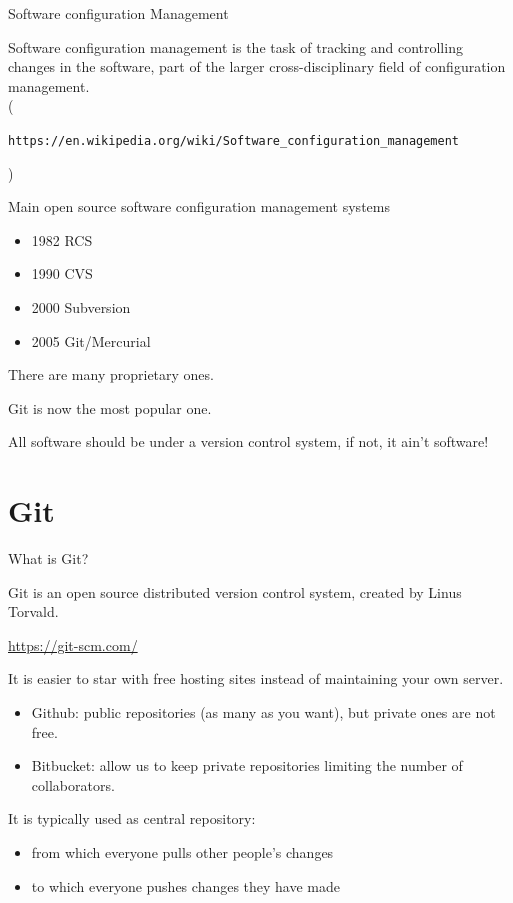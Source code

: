 \documentclass{beamer}
\begin{document}
\begin{frame}[plain]{Software configuration Management}


Software configuration management is the task of tracking and controlling changes in the software, part of the larger cross-disciplinary field of configuration management.\\
(\begin{scriptsize}\texttt{https://en.wikipedia.org/wiki/Software\_configuration\_management}                                                                                         \end{scriptsize})

Main open source software configuration management systems
\begin{itemize}
 \item 1982 RCS
 \item 1990 CVS
 \item 2000 Subversion
 \item 2005 Git/Mercurial
\end{itemize}

There are many proprietary ones. 

Git is now the most popular one.

All software should be under a version control system, if not, it ain't software!

\end{frame}

\section{Git}

\begin{frame}{What is Git?}

Git is an open source distributed version control system, created by Linus Torvald.

\url{https://git-scm.com/}

It is easier to star with free hosting sites instead of maintaining your own server.

\begin{itemize}
 \item Github: public repositories (as many as you want), but private ones are not free.
 \item Bitbucket: allow us to keep private repositories limiting the number of collaborators.
\end{itemize}

It is typically used as central repository:
\begin{itemize}
 \item from which everyone pulls other people’s changes
 \item to which everyone pushes changes they have made
\end{itemize}

\end{frame}
\end{document}
